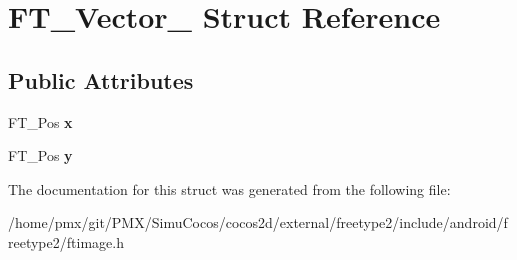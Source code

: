 \hypertarget{structFT__Vector__}{}\section{F\+T\+\_\+\+Vector\+\_\+ Struct Reference}
\label{structFT__Vector__}
\subsection*{Public Attributes}
\begin{DoxyCompactItemize}
\item 
\mbox{\label{structFT__Vector___a941e818e6dfca06409cddff4f325f74c}} 
F\+T\+\_\+\+Pos {\bfseries x}
\item 
\mbox{\label{structFT__Vector___ac3246ed214e880047ec74eeb15f8b973}} 
F\+T\+\_\+\+Pos {\bfseries y}
\end{DoxyCompactItemize}


The documentation for this struct was generated from the following file\+:\begin{DoxyCompactItemize}
\item 
/home/pmx/git/\+P\+M\+X/\+Simu\+Cocos/cocos2d/external/freetype2/include/android/freetype2/ftimage.\+h\end{DoxyCompactItemize}
